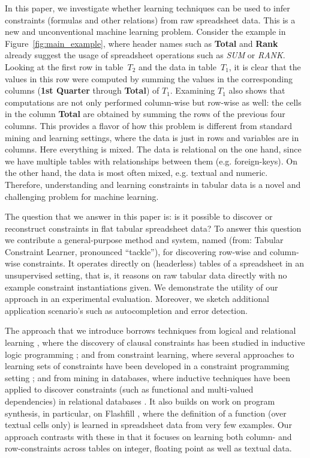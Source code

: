 In this paper,  we investigate whether learning techniques can be used to infer constraints (formulas and other relations) from raw spreadsheet data.
This is a new and unconventional machine learning problem.
Consider the example in Figure~\ref{fig:main_example}, where header names such as \textbf{Total} and \textbf{Rank} already suggest the usage of spreadsheet operations such as \textit{SUM} or \textit{RANK}.
Looking at the first row in table~$T_2$ and the data in table~$T_1$, it is clear that the values in this row were computed by summing the values in the corresponding columns (\textbf{1st Quarter} through \textbf{Total}) of $T_1$.
Examining $T_1$ also shows that computations are not only performed column-wise but row-wise as well: the cells in the column \textbf{Total} are obtained by summing the rows of the previous four columns.
This provides a flavor of how this problem is different from standard mining and learning settings, where the data is just in rows and variables are in columns. Here everything is mixed. The data is relational on the one hand, since we have multiple tables with relationships between them (e.g. foreign-keys). On the other hand, the data is most often mixed, e.g. textual and numeric. %
Therefore, understanding and learning constraints in tabular data is a novel and challenging problem for machine learning.

The question that we answer in this paper is: is it possible to discover or reconstruct constraints in flat tabular spreadsheet data?
To answer this question we contribute a general-purpose method and system, named \sname (from: Tabular Constraint Learner, pronounced ``tackle''), for discovering row-wise and column-wise constraints.
It operates directly on (headerless) tables of a spreadsheet in an unsupervised setting, that is, it reasons on raw tabular data directly with no example constraint instantiations given. %
We demonstrate the utility of our approach in an experimental evaluation.
Moreover, we sketch additional application scenario's such as autocompletion and error detection.

The approach that we introduce borrows techniques from logical and relational learning \cite{luc_book}, where the discovery of clausal constraints has been studied in inductive logic programming \cite{claudien,lallouet}; and from constraint learning,  where several approaches to learning sets of constraints have been developed in a constraint programming setting \cite{Quacq,Conacq,modelseeker};
and from mining in databases, where inductive techniques have been applied to discover constraints (such as functional and multi-valued dependencies) in relational databases \cite{savnik}.  It also builds on work on program synthesis, in particular, on Flashfill \cite{flashfill}, where the definition of a function (over textual cells only) is learned in spreadsheet data from
very few examples.
Our approach contrasts with these in that it focuses on learning both column- and row-constraints across tables on integer, floating point as well as textual data.


